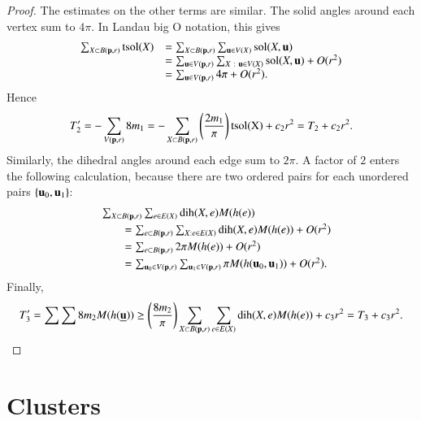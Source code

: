 \begin{proof}
The estimates on the other terms are similar.  The solid angles
around each vertex sum to $4\pi$.
In Landau big O notation, this gives
$$
\begin{array}{lll}
\sum_{X\subset B({\mathbf p},r)} {\operatorname{tsol}}(X) &= 
\sum_{X\subset B({\mathbf p},r)} \sum_{ {\mathbf u}\in V(X)} \operatorname{sol}(X, {\mathbf u})\\
 &=\sum_{ {\mathbf u}\in  V({\mathbf p},r)} \sum_{X\ :\   {\mathbf u}\in V(X)} \operatorname{sol}(X, {\mathbf u}) + O(r^2)\\
 &=\sum_{ {\mathbf u}\in  V({\mathbf p},r)} 4\pi    + O(r^2).
\end{array}
$$
Hence
$$
T_2' = -\sum_{ V({\mathbf p},r)} 8 m_1 = -\sum_{X\subset B({\mathbf p},r)}\left(\frac{2m_1}\pi\right) {\operatorname{tsol(X)}} + c_2 r^2 = T_2 + c_2 r^2.
$$
Similarly, the dihedral angles around each edge sum to $2\pi$.  A factor of $2$ enters the following calculation, because there are two ordered pairs for each unordered pairs $\{ {\mathbf u}_0, {\mathbf u}_1\}$:
$$
\begin{array}{lll}
&\sum_{X\subset B(\p,r)} \sum_{e\in E(X)} \dih(X,e)  M(h(e)) \vspace{3pt}\\
&\qquad=\sum_{e\subset B(\p,r)} \sum_{X: e\in E(X)} \dih(X,e)  M(h(e)) +O(r^2)\vspace{3pt}\\
 &\qquad=\sum_{e\subset B(\p,r)} 2\pi M(h(e)) + O(r^2)\vspace{3pt} \\
 &\qquad=\sum_{ \u_0\in  V(\p,r)} \sum_{ \u_1\in  V(\p,r) } \pi M(h( \u_0, \u_1)) + O(r^2).\\
\end{array}
$$
Finally,
$$
T_3' = \sum\sum 8 m_2 M(h({\underline{{\mathbf u}}})) \ge \left(\frac{8m_2}\pi\right)
\sum_{X\subset B({\mathbf p},r)}\sum_{e\in E(X)}\operatorname{dih}(X,e) M(h(e)) + c_3 r^2 = T_3 + c_3 r^2.
$$
\end{proof}




\section{Clusters}

